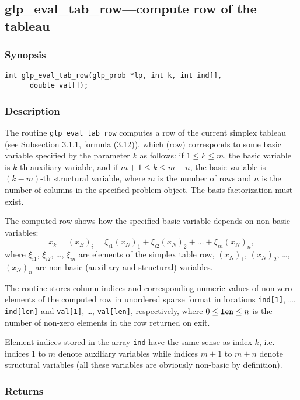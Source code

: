 \subsection{glp\_eval\_tab\_row---compute row of the tableau}

\subsubsection*{Synopsis}

\begin{verbatim}
int glp_eval_tab_row(glp_prob *lp, int k, int ind[],
      double val[]);
\end{verbatim}

\subsubsection*{Description}

The routine \verb|glp_eval_tab_row| computes a row of the current
simplex tableau (see Subsection 3.1.1, formula (3.12)), which (row)
corresponds to some basic variable specified by the parameter $k$ as
follows: if $1\leq k\leq m$, the basic variable is $k$-th auxiliary
variable, and if $m+1\leq k\leq m+n$, the basic variable is $(k-m)$-th
structural variable, where $m$ is the number of rows and $n$ is the
number of columns in the specified problem object. The basis
factorization must exist.

The computed row shows how the specified basic variable depends on
non-basic variables:
$$x_k=(x_B)_i=\xi_{i1}(x_N)_1+\xi_{i2}(x_N)_2+\dots+\xi_{in}(x_N)_n,$$
where $\xi_{i1}$, $\xi_{i2}$, \dots, $\xi_{in}$ are elements of the
simplex table row, $(x_N)_1$, $(x_N)_2$, \dots, $(x_N)_n$ are non-basic
(auxiliary and structural) variables.

The routine stores column indices and corresponding numeric values of
non-zero elements of the computed row in unordered sparse format in
locations \verb|ind[1]|, \dots, \verb|ind[len]| and \verb|val[1]|,
\dots, \verb|val[len]|, respectively, where $0\leq{\tt len}\leq n$ is
the number of non-zero elements in the row returned on exit.

Element indices stored in the array \verb|ind| have the same sense as
index $k$, i.e. indices 1 to $m$ denote auxiliary variables while
indices $m+1$ to $m+n$ denote structural variables (all these variables
are obviously non-basic by definition).

\subsubsection*{Returns}

